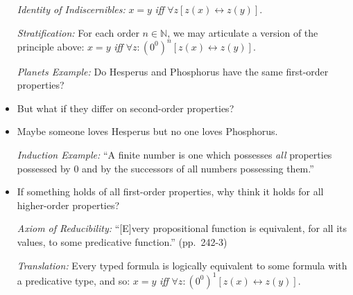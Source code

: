\documentclass[a4paper, 11pt]{article} %
\newcommand{\N}{\mathbb{N}}
\begin{document}
\begin{itemize}
  \item[\it Identity of Indiscernibles:] $x = y$ \textit{iff} $\forall z [z(x) \leftrightarrow z(y)]$.
  \item[\it Stratification:] For each order $n\in \N$, we may articulate a version of the principle above:
    $x = y$ \textit{iff} $\forall z : (0^0)^n [z(x) \leftrightarrow z(y)]$.
  \item[\it Planets Example:] Do Hesperus and Phosphorus have the same first-order properties?
    \item But what if they differ on second-order properties?
    \item Maybe someone loves Hesperus but no one loves Phosphorus.
  \item[\it Induction Example:] ``A finite number is one which possesses \textit{all} properties possessed by $0$ and by the successors of all numbers possessing them.''
    \item If something holds of all first-order properties, why think it holds for all higher-order properties?
  \item[\it Axiom of Reducibility:] ``[E]very propositional function is equivalent, for all its values, to some predicative function.'' (pp.~242-3)
  \item[\it Translation:] Every typed formula is logically equivalent to some formula with a predicative type, and so:
    $x = y$ \textit{iff} $\forall z : (0^0)^1 [z(x) \leftrightarrow z(y)]$.
\end{itemize}
\end{document}
